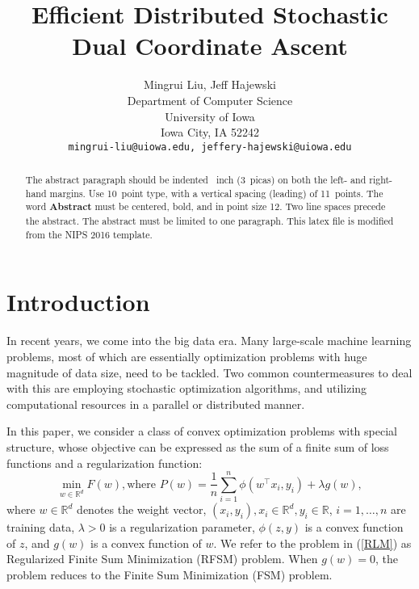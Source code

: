 \documentclass{article}
\title{Efficient Distributed Stochastic Dual Coordinate Ascent}
\author{
  Mingrui Liu, Jeff Hajewski \\
  Department of Computer Science\\
  University of Iowa\\
  Iowa City, IA  52242 \\
  \texttt{mingrui-liu@uiowa.edu, jeffery-hajewski@uiowa.edu} \\
}
\def \R {\mathbb{R}}
\def \R {\mathbb{R}}
\begin{document}

\maketitle

\begin{abstract}
  The abstract paragraph should be indented ~inch
  (3~picas) on both the left- and right-hand margins. Use 10~point
  type, with a vertical spacing (leading) of 11~points.  The word
  \textbf{Abstract} must be centered, bold, and in point size 12. Two
  line spaces precede the abstract. The abstract must be limited to
  one paragraph. This latex file is modified from the NIPS  2016 template. 
\end{abstract}

\section{Introduction}
In recent years, we come into the big data era. Many large-scale machine learning problems, most of which are essentially optimization problems with huge magnitude of data size, need to be tackled. Two common countermeasures to deal with this are employing stochastic optimization algorithms, and utilizing computational resources in a parallel or distributed manner\cite{boyd2011distributed}. 

In this paper, we consider a class of convex optimization problems with special structure, whose objective can be expressed as the sum of a finite sum of loss functions and a regularization function:
\begin{equation}
\label{RLM}
	\min_{w\in\R^d}F(w), \text{where }P(w)=\frac{1}{n}\sum_{i=1}^{n}\phi(w^\top x_i,y_i)+\lambda g(w),
\end{equation}
where $w\in\R^d$ denotes the weight vector, $(x_i,y_i),x_i\in\R^d,y_i\in\R$, $i=1,\ldots,n$ are training data, $\lambda>0$ is a regularization parameter, $\phi(z,y)$ is a convex function of $z$, and $g(w)$ is a convex function of $w$. We refer to the problem in (\ref{RLM}) as Regularized Finite Sum Minimization (RFSM) problem. When $g(w)=0$, the problem reduces to the Finite Sum Minimization (FSM) problem.
\end{document}
